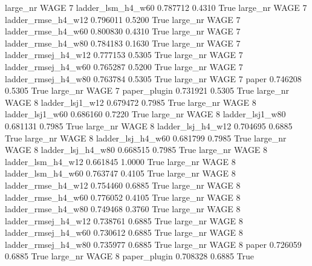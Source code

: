   large_nr     WAGE                 7   ladder_lsm_h4_w60   0.787712      0.4310    True
  large_nr     WAGE                 7  ladder_rmse_h4_w12   0.796011      0.5200    True
  large_nr     WAGE                 7  ladder_rmse_h4_w60   0.800830      0.4310    True
  large_nr     WAGE                 7  ladder_rmse_h4_w80   0.784183      0.1630    True
  large_nr     WAGE                 7 ladder_rmsej_h4_w12   0.777153      0.5305    True
  large_nr     WAGE                 7 ladder_rmsej_h4_w60   0.765287      0.5200    True
  large_nr     WAGE                 7 ladder_rmsej_h4_w80   0.763784      0.5305    True
  large_nr     WAGE                 7               paper   0.746208      0.5305    True
  large_nr     WAGE                 7        paper_plugin   0.731921      0.5305    True
  large_nr     WAGE                 8     ladder_lsj1_w12   0.679472      0.7985    True
  large_nr     WAGE                 8     ladder_lsj1_w60   0.686160      0.7220    True
  large_nr     WAGE                 8     ladder_lsj1_w80   0.681131      0.7985    True
  large_nr     WAGE                 8   ladder_lsj_h4_w12   0.704695      0.6885    True
  large_nr     WAGE                 8   ladder_lsj_h4_w60   0.681799      0.7985    True
  large_nr     WAGE                 8   ladder_lsj_h4_w80   0.668515      0.7985    True
  large_nr     WAGE                 8   ladder_lsm_h4_w12   0.661845      1.0000    True
  large_nr     WAGE                 8   ladder_lsm_h4_w60   0.763747      0.4105    True
  large_nr     WAGE                 8  ladder_rmse_h4_w12   0.754460      0.6885    True
  large_nr     WAGE                 8  ladder_rmse_h4_w60   0.776052      0.4105    True
  large_nr     WAGE                 8  ladder_rmse_h4_w80   0.749468      0.3760    True
  large_nr     WAGE                 8 ladder_rmsej_h4_w12   0.738761      0.6885    True
  large_nr     WAGE                 8 ladder_rmsej_h4_w60   0.730612      0.6885    True
  large_nr     WAGE                 8 ladder_rmsej_h4_w80   0.735977      0.6885    True
  large_nr     WAGE                 8               paper   0.726059      0.6885    True
  large_nr     WAGE                 8        paper_plugin   0.708328      0.6885    True